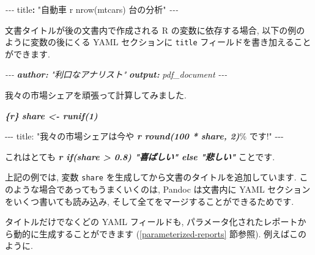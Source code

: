 \documentclass[
  11pt,
  lualatex,
  ja=standard]{bxjsreport}
\newenvironment{Shaded}{\begin{snugshade}}{\end{snugshade}}
\newcommand{\AnnotationTok}[1]{\textcolor[rgb]{0.56,0.35,0.01}{\textbf{\textit{#1}}}}
\newcommand{\AttributeTok}[1]{\textcolor[rgb]{0.77,0.63,0.00}{#1}}
\newcommand{\CommentTok}[1]{\textcolor[rgb]{0.56,0.35,0.01}{\textit{#1}}}
\newcommand{\FunctionTok}[1]{\textcolor[rgb]{0.00,0.00,0.00}{#1}}
\newcommand{\InformationTok}[1]{\textcolor[rgb]{0.56,0.35,0.01}{\textbf{\textit{#1}}}}
\newcommand{\KeywordTok}[1]{\textcolor[rgb]{0.13,0.29,0.53}{\textbf{#1}}}
\newcommand{\NormalTok}[1]{#1}
\newcommand{\PreprocessorTok}[1]{\textcolor[rgb]{0.56,0.35,0.01}{\textit{#1}}}
\newcommand{\StringTok}[1]{\textcolor[rgb]{0.31,0.60,0.02}{#1}}
\begin{document}
\begin{Shaded}
\begin{Highlighting}[]
\PreprocessorTok{{-}{-}{-}}
\FunctionTok{title}\KeywordTok{:}\AttributeTok{ }\StringTok{"自動車 \textasciigrave{}r nrow(mtcars)\textasciigrave{} 台の分析"}
\PreprocessorTok{{-}{-}{-}}
\end{Highlighting}
\end{Shaded}

文書タイトルが後の文書内で作成される R の変数に依存する場合, 以下の例のように変数の後にくる YAML セクションに \texttt{title} フィールドを書き加えることができます.

\begin{Shaded}
\begin{Highlighting}[]
\CommentTok{{-}{-}{-}}
\AnnotationTok{author:}\CommentTok{ "利口なアナリスト"}
\AnnotationTok{output:}\CommentTok{ pdf\_document}
\CommentTok{{-}{-}{-}}

\NormalTok{我々の市場シェアを頑張って計算してみました.}

\InformationTok{\textasciigrave{}\textasciigrave{}\textasciigrave{}\{r\}}
\InformationTok{share \textless{}{-} runif(1)}
\InformationTok{\textasciigrave{}\textasciigrave{}\textasciigrave{}}

\NormalTok{{-}{-}{-}}
\NormalTok{title: "我々の市場シェアは今や }\InformationTok{\textasciigrave{}r round(100 * share, 2)\textasciigrave{}}\NormalTok{\% です!"}
\NormalTok{{-}{-}{-}}

\NormalTok{これはとても }\InformationTok{\textasciigrave{}r if(share \textgreater{} 0.8) "喜ばしい" else "悲しい"\textasciigrave{}}\NormalTok{ ことです.}
\end{Highlighting}
\end{Shaded}

上記の例では, 変数 \texttt{share} を生成してから文書のタイトルを追加しています. このような場合であってもうまくいくのは, Pandoc は文書内に YAML セクションをいくつ書いても読み込み, そして全てをマージすることができるためです.

タイトルだけでなくどの YAML フィールドも, パラメータ化されたレポートから動的に生成することができます (\ref{parameterized-reports} 節参照). 例えばこのように.

\begin{Shaded}
\end{Shaded}
\end{document}
